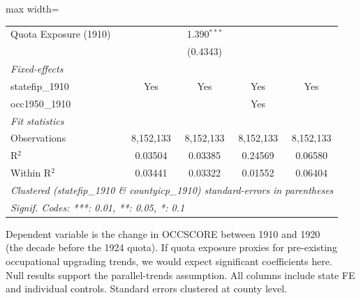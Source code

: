 \begin{table}[htbp]
\begin{adjustbox}{max width=\textwidth}
\begin{tabular}{lcccc}
      Quota Exposure (1910) &                               & 1.390$^{***}$                 &                          &   \\   
                            &                               & (0.4343)                      &                          &   \\   
      \midrule
      \emph{Fixed-effects}\\
      statefip\_1910        & Yes                           & Yes                           & Yes                      & Yes\\  
      occ1950\_1910         &                               &                               & Yes                      & \\  
      \midrule
      \emph{Fit statistics}\\
      Observations          & 8,152,133                     & 8,152,133                     & 8,152,133                & 8,152,133\\  
      R$^2$                 & 0.03504                       & 0.03385                       & 0.24569                  & 0.06580\\  
      Within R$^2$          & 0.03441                       & 0.03322                       & 0.01552                  & 0.06404\\  
      \midrule \midrule
      \multicolumn{5}{l}{\emph{Clustered (statefip\_1910 \& countyicp\_1910) standard-errors in parentheses}}\\
      \multicolumn{5}{l}{\emph{Signif. Codes: ***: 0.01, **: 0.05, *: 0.1}}\\
   \end{tabular}
   \end{adjustbox}

   \par \raggedright 
   Dependent variable is the change in OCCSCORE between 1910 and 1920\\
   (the decade before the 1924 quota). If quota exposure proxies for pre-existing\\
   occupational upgrading trends, we would expect significant coefficients here.\\
   Null results support the parallel-trends assumption. All columns include state FE\\
   and individual controls. Standard errors clustered at county level.
\end{table}


